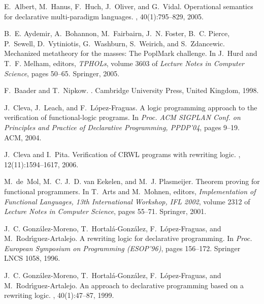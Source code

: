 \documentclass{llncs}
\begin{document}
\begin{thebibliography}{10}

E.~Albert, M.~Hanus, F.~Huch, J.~Oliver, and G.~Vidal.
\newblock Operational semantics for declarative multi-paradigm languages.
, 40(1):795--829, 2005.

B.~E. Aydemir, A.~Bohannon, M.~Fairbairn, J.~N. Foster, B.~C. Pierce,
  P.~Sewell, D.~Vytiniotis, G.~Washburn, S.~Weirich, and S.~Zdancewic.
\newblock Mechanized metatheory for the masses: The {PoplMark} challenge.
\newblock In J.~Hurd and T.~F. Melham, editors, {\em TPHOLs}, volume 3603 of
  {\em Lecture Notes in Computer Science}, pages 50--65. Springer, 2005.

F.~Baader and T.~{}Nipkow.
.
\newblock Cambridge University Press, United Kingdom, 1998.

J.~Cleva, J.~Leach, and F.~L\'{o}pez-Fraguas.
\newblock A logic programming approach to the verification of functional-logic
  programs.
\newblock In {\em Proc. ACM SIGPLAN Conf. on Principles and Practice of
  Declarative Programming, PPDP'04}, pages 9--19. ACM, 2004.

J.~Cleva and I.~Pita.
\newblock Verification of {CRWL} programs with rewriting logic.
, 12(11):1594--1617, 2006.

M.~de~Mol, M.~C. J.~D. van Eekelen, and M.~J. Plasmeijer.
\newblock Theorem proving for functional programmers.
\newblock In T.~Arts and M.~Mohnen, editors, {\em Implementation of Functional
  Languages, 13th International Workshop, IFL 2002}, volume 2312 of {\em
  Lecture Notes in Computer Science}, pages 55--71. Springer, 2001.

J.~C. G{onz\'alez-Moreno}, T.~H{ortal\'a-Gonz\'alez}, F.~L{\'opez-Fraguas}, and
  M.~R{odr\'{\i}guez-Artalejo}.
\newblock A rewriting logic for declarative programming.
\newblock In {\em Proc. European Symposium on Programming (ESOP'96)}, pages
  156--172. Springer LNCS 1058, 1996.

J.~C. G{onz\'alez-Moreno}, T.~H{ortal\'a-Gonz\'alez}, F.~L{\'opez-Fraguas}, and
  M.~R{odr\'{\i}guez-Artalejo}.
\newblock An approach to declarative programming based on a rewriting logic.
, 40(1):47--87, 1999.


\end{thebibliography}
\end{document}
